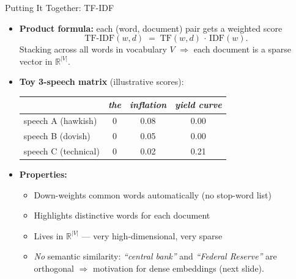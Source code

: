 \begin{frame}{Putting It Together: TF-IDF}
\begin{itemize}
\item \textbf{Product formula:} each (word, document) pair gets a weighted score
\[
   \text{TF-IDF}(w, d) \;=\; \text{TF}(w, d)\,\cdot\,\text{IDF}(w).
\]
Stacking across all words in vocabulary $V$ $\Rightarrow$ each document is a sparse vector in $\mathbb{R}^{|V|}$.

\medskip
\item \textbf{Toy 3-speech matrix} (illustrative scores):
\begin{center}
\begin{tabular}{l c c c}
\toprule
 & \emph{the} & \emph{inflation} & \emph{yield curve} \\
\midrule
speech A (hawkish)   & 0 & 0.08 & 0.00 \\
speech B (dovish)    & 0 & 0.05 & 0.00 \\
speech C (technical) & 0 & 0.02 & 0.21 \\
\bottomrule
\end{tabular}
\end{center}

\medskip
\item \textbf{Properties:}
\begin{itemize}
    \item Down-weights common words automatically (no stop-word list)
    \item Highlights distinctive words for each document
    \item Lives in $\mathbb{R}^{|V|}$ --- very high-dimensional, very sparse
    \item \emph{No} semantic similarity: \emph{``central bank''} and \emph{``Federal Reserve''} are orthogonal $\Rightarrow$ motivation for dense embeddings (next slide).
\end{itemize}
\end{itemize}
\end{frame}

